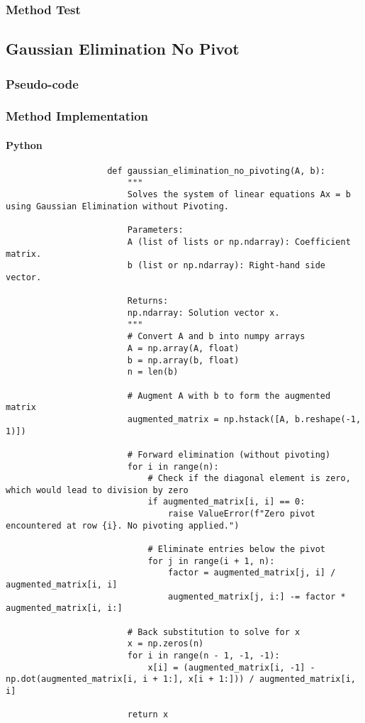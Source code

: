 \documentclass{article}
\begin{document}
        \subsubsection{Method Test}

    \subsection{Gaussian Elimination No Pivot}
        \subsubsection{Pseudo-code}
        \subsubsection{Method Implementation}
            \paragraph{Python}
                \begin{verbatim}
                    def gaussian_elimination_no_pivoting(A, b):
                        """
                        Solves the system of linear equations Ax = b using Gaussian Elimination without Pivoting.

                        Parameters:
                        A (list of lists or np.ndarray): Coefficient matrix.
                        b (list or np.ndarray): Right-hand side vector.

                        Returns:
                        np.ndarray: Solution vector x.
                        """
                        # Convert A and b into numpy arrays
                        A = np.array(A, float)
                        b = np.array(b, float)
                        n = len(b)

                        # Augment A with b to form the augmented matrix
                        augmented_matrix = np.hstack([A, b.reshape(-1, 1)])

                        # Forward elimination (without pivoting)
                        for i in range(n):
                            # Check if the diagonal element is zero, which would lead to division by zero
                            if augmented_matrix[i, i] == 0:
                                raise ValueError(f"Zero pivot encountered at row {i}. No pivoting applied.")

                            # Eliminate entries below the pivot
                            for j in range(i + 1, n):
                                factor = augmented_matrix[j, i] / augmented_matrix[i, i]
                                augmented_matrix[j, i:] -= factor * augmented_matrix[i, i:]

                        # Back substitution to solve for x
                        x = np.zeros(n)
                        for i in range(n - 1, -1, -1):
                            x[i] = (augmented_matrix[i, -1] - np.dot(augmented_matrix[i, i + 1:], x[i + 1:])) / augmented_matrix[i, i]

                        return x
                \end{verbatim}
\end{document}

